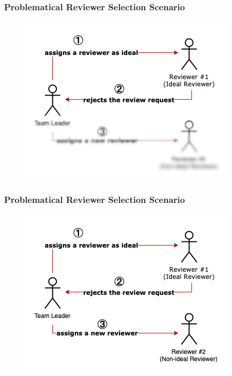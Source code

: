 \documentclass{beamer}
\begin{document}
\begin{frame}
\frametitle{\large Problematical Reviewer Selection Scenario}
  \begin{figure}
    \includegraphics[scale=0.6]{img/gt_2.png}
    \end{figure}

\end{frame}
\begin{frame}
\frametitle{\large Problematical Reviewer Selection Scenario}
  \begin{figure}
    \includegraphics[scale=0.6]{img/gt_3.png}
    \end{figure}

\end{frame}


\iffalse
\end{document}
